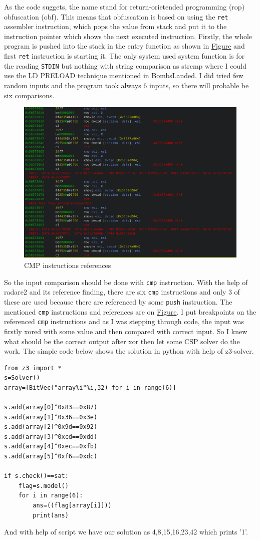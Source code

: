 \documentclass[11pt]{article}
\begin{document}
As the code suggets, the name stand for return-orietended programming (rop) obfuscation (obf). This means that obfuscation is based on using the \texttt{ret} assembler instruction, which pops the value from stack and put it to the instruction pointer which shows the next executed instruction. Firstly, the whole program is pushed into the stack in the entry function as shown in \hyperref[fig-rop-entry]{Figure} and first \texttt{ret} instruction is starting it. The only system used system function is for the reading \texttt{STDIN} but nothing with string comparison as strcmp where I could use the LD PRELOAD technique mentioned in BombsLanded.
I did tried few random inputs and the program took always 6 inputs, so there will probable be six comparisons.
\begin{figure}[htbp]
\centering
\includegraphics[width=.9\linewidth]{simple_cmp.png}
\caption{\label{fig-cmp}CMP instructions references}
\end{figure}

So the input comparison should be done with \texttt{cmp} instruction. With the help of radare2 and its reference finding, there are six \texttt{cmp} instructions and only 3 of these are used because there are referenced by some \texttt{push} instruction. The mentioned \texttt{cmp} instructions and references are on \hyperref[fig-cmp]{Figure}. I put breakpoints on the referenced \texttt{cmp} instructions and as I was stepping through code, the input was firstly xored with some value and then compared with correct input. So I knew what should be the correct output after xor then let some CSP solver do the work. The simple code below shows the solution in python with help of z3-solver.

\begin{verbatim}
from z3 import *
s=Solver()
array=[BitVec("array%i"%i,32) for i in range(6)]

s.add(array[0]^0x83==0x87)
s.add(array[1]^0x36==0x3e)
s.add(array[2]^0x9d==0x92)
s.add(array[3]^0xcd==0xdd)
s.add(array[4]^0xec==0xfb)
s.add(array[5]^0xf6==0xdc)

if s.check()==sat:
    flag=s.model()
    for i in range(6):
        ans=((flag[array[i]]))
        print(ans)
\end{verbatim}

And with help of script we have our solution as 4,8,15,16,23,42 which prints '1'.
\end{document}
